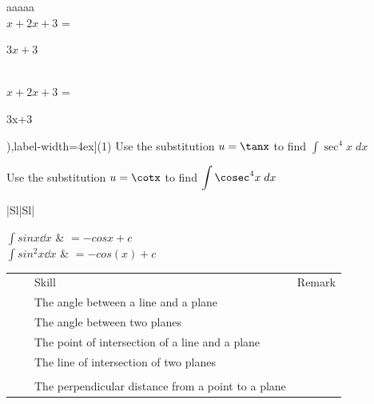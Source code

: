 aaaaa\\

$x + 2x + 3 $ = \begin{envFillIn}[5cm] $3x+3$\end{envFillIn}\\


$x + 2x + 3 $ = \begin{envFillIn}[4cm] 3x+3\end{envFillIn}

\clearpage






\newpage
\begin{exercise}
    \begin{tasks}[after-item-skip=2pt,after-skip=3pt, counter-format=(tsk[1]),label-width=4ex](1)
        \task  Use the substitution $u=\tanx$ to find $\displaystyle \int \sec^4x \;   dx $ 
                
        \task  Use the substitution $u=\cotx$ to find $\displaystyle \int \cosec^4x \; dx $ 
                
    \end{tasks}
\end{exercise}


\begin{table}[ht]
   \centering
   \sffamily
   \begin{tabular}{|Sl|Sl|}
     
        \hline   $ \int sinx     \dd x $ & $=-cosx + c$ 
     \\ \hline   $ \int sin^2x   \dd x $ & $=-cos(x) + c$
     \\ \hline
  \end{tabular}
\end{table}





\begin{center}
\begin{tabular}{|*{4}{l|}}
\hline
\rowcolor{lightgray}  &  & Skill & Remark \tabularnewline
                      &  & The angle between a line and a plane               & \tabularnewline
\hline
                      &  & The angle between two planes                       & \tabularnewline
\hline
                      &  & The point of intersection of a line and a plane    & \tabularnewline
\hline
                      &  & The line of intersection of two planes             & \tabularnewline
\hline
                      &  &                                                    & \tabularnewline
\hline
                      &  & The perpendicular distance from a point to a plane & \tabularnewline
\hline
\end{tabular}
\end{center}



